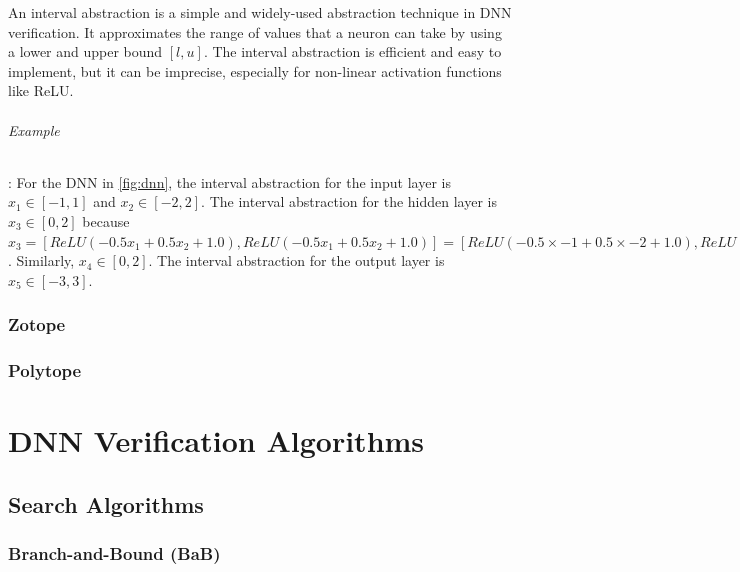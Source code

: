 \documentclass[oneside,11pt,dvipsnames]{book}
\begin{document}
An interval abstraction is a simple and widely-used abstraction technique in DNN verification. It approximates the range of values that a neuron can take by using a lower and upper bound $[l, u]$. The interval abstraction is efficient and easy to implement, but it can be imprecise, especially for non-linear activation functions like ReLU. 

\paragraph{Example}: For the DNN in \autoref{fig:dnn}, the interval abstraction for the input layer is $x_1 \in [-1, 1]$ and $x_2 \in [-2, 2]$. The interval abstraction for the hidden layer is $x_3 \in [0, 2]$ because $x_3 = [ReLU(-0.5x_1 + 0.5x_2 + 1.0), ReLU(-0.5x_1 + 0.5x_2 + 1.0)] = [ReLU(-0.5 \times -1 + 0.5 \times -2 + 1.0), ReLU(-0.5 \times 1 + 0.5 \times 2 + 1.0)] = [0, 2]$. Similarly, $x_4 \in [0, 2]$. The interval abstraction for the output layer is $x_5 \in [-3, 3]$.




\section{Zotope}
\section{Polytope}



\part{DNN Verification Algorithms}
\chapter{Search Algorithms}

\section{Branch-and-Bound (BaB)}\label{sec:bab}

    

\end{document}
